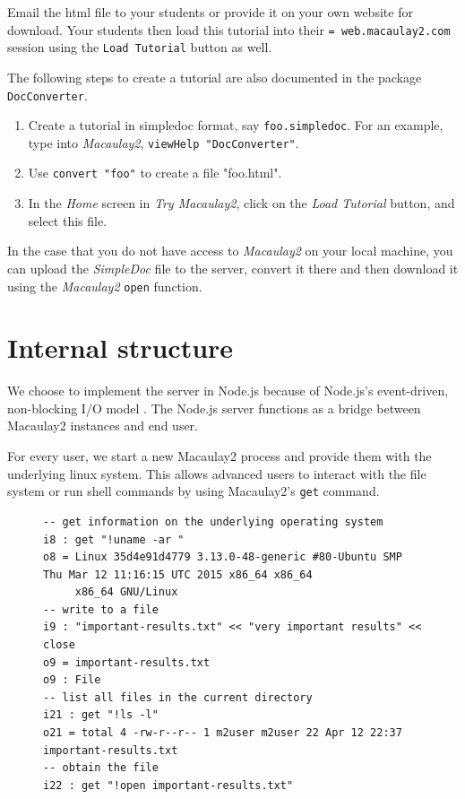 \documentclass[twocolumn]{article}
\def\tryM2{{\it Try Macaulay2}}
\def\M2{{\it Macaulay2}}
\begin{document}
Email the html file to your students or provide it on your own website for download. Your students then load this tutorial into their {\tt= web.macaulay2.com} session using the {\tt Load Tutorial} button as well.

The following steps to create a tutorial are also documented in the package {\tt DocConverter}.
\begin{enumerate}
\item Create a tutorial in simpledoc format, say {\tt foo.simpledoc}.  For an example, type into \M2, {\tt viewHelp "DocConverter"}.
\item Use {\tt convert "foo"} to create a file "foo.html".
\item In the {\it Home} screen in \tryM2, click on the {\it Load Tutorial} button, and select this file.
\end{enumerate}

In the case that you do not have access to \M2 on your local machine, you can upload the {\it SimpleDoc} file to the server, convert it there and then download it using the \M2 {\tt open} function.


\section{Internal structure}

We choose to implement the server in Node.js
because of Node.js's event-driven, non-blocking I/O model \cite{nodejs}.
The Node.js server functions as a bridge between Macaulay2 instances and end user.

For every user, we start a new Macaulay2 process and
provide them with the underlying linux system. This allows advanced users to
interact with the file system or run shell commands by using Macaulay2's {\tt get} command.
\begin{figure}[htb]
\begin{lstlisting}[breaklines]
-- get information on the underlying operating system
i8 : get "!uname -ar "
o8 = Linux 35d4e91d4779 3.13.0-48-generic #80-Ubuntu SMP Thu Mar 12 11:16:15 UTC 2015 x86_64 x86_64
     x86_64 GNU/Linux
-- write to a file     
i9 : "important-results.txt" << "very important results" << close
o9 = important-results.txt
o9 : File
-- list all files in the current directory
i21 : get "!ls -l"
o21 = total 4 -rw-r--r-- 1 m2user m2user 22 Apr 12 22:37 important-results.txt
-- obtain the file
i22 : get "!open important-results.txt"
\end{lstlisting}
\end{figure}
\end{document}
